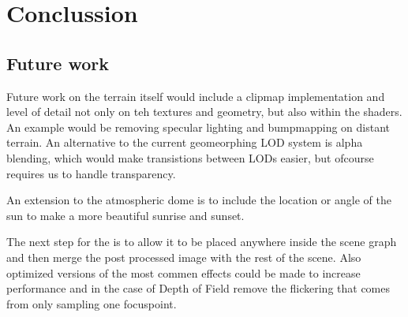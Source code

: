 
\chapter{Conclussion}








\section{Future work}

Future work on the terrain itself would include a clipmap
implementation and level of detail not only on teh textures and
geometry, but also within the shaders. An example would be removing
specular lighting and bumpmapping on distant terrain. An alternative
to the current geomeorphing LOD system is alpha blending, which would
make transistions between LODs easier, but ofcourse requires us to
handle transparency.



An extension to the atmospheric dome is to include the location or
angle of the sun to make a more beautiful sunrise and sunset.


The next step for the  is to allow it to be
placed anywhere inside the scene graph and then merge the post
processed image with the rest of the scene. Also optimized versions of
the most commen effects could be made to increase performance and in
the case of Depth of Field remove the flickering that comes from only
sampling one focuspoint.

